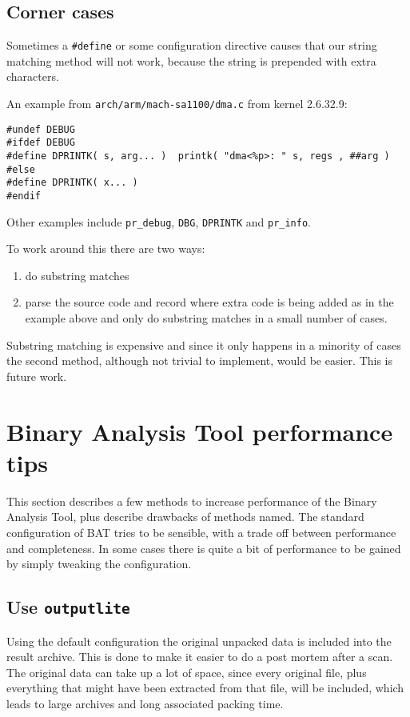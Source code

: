 \documentclass[10pt]{article}
\begin{document}
\subsection{Corner cases}

Sometimes a \texttt{\#define} or some configuration directive causes that our 
string matching method will not work, because the string is prepended with
extra characters.

An example from \texttt{arch/arm/mach-sa1100/dma.c} from kernel 2.6.32.9:

\begin{verbatim}
#undef DEBUG
#ifdef DEBUG
#define DPRINTK( s, arg... )  printk( "dma<%p>: " s, regs , ##arg )
#else
#define DPRINTK( x... )
#endif
\end{verbatim}

Other examples include \texttt{pr\_debug}, \texttt{DBG}, \texttt{DPRINTK} and
\texttt{pr\_info}.

To work around this there are two ways:

\begin{enumerate}
\item do substring matches
\item parse the source code and record where extra code is being added as in
the example above and only do substring matches in a small number of cases.
\end{enumerate}

Substring matching is expensive and since it only happens in a minority of
cases the second method, although not trivial to implement, would be easier.
This is future work.

\section{Binary Analysis Tool performance tips}

This section describes a few methods to increase performance of the Binary
Analysis Tool, plus describe drawbacks of methods named. The standard
configuration of BAT tries to be sensible, with a trade off between performance
and completeness. In some cases there is quite a bit of performance to be
gained by simply tweaking the configuration.

\subsection{Use \texttt{outputlite}}

Using the default configuration the original unpacked data is included into
the result archive. This is done to make it easier to do a post mortem after a
scan. The original data can take up a lot of space, since every original file,
plus everything that might have been extracted from that file, will be
included, which leads to large archives and long associated packing time.
\end{document}
